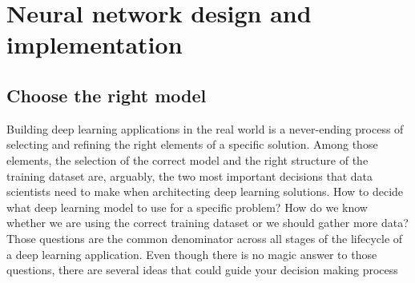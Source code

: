 
\chapter{Neural network design and implementation} %

\label{Chapter4} %


\section{Choose the right model}
Building deep learning applications in the real world is a never-ending process of selecting and refining the right elements of a specific solution. Among those elements, the selection of the correct model and the right structure of the training dataset are, arguably, the two most important decisions that data scientists need to make when architecting deep learning solutions. How to decide what deep learning model to use for a specific problem? How do we know whether we are using the correct training dataset or we should gather more data? Those questions are the common denominator across all stages of the lifecycle of a deep learning application. Even though there is no magic answer to those questions, there are several ideas that could guide your decision making process